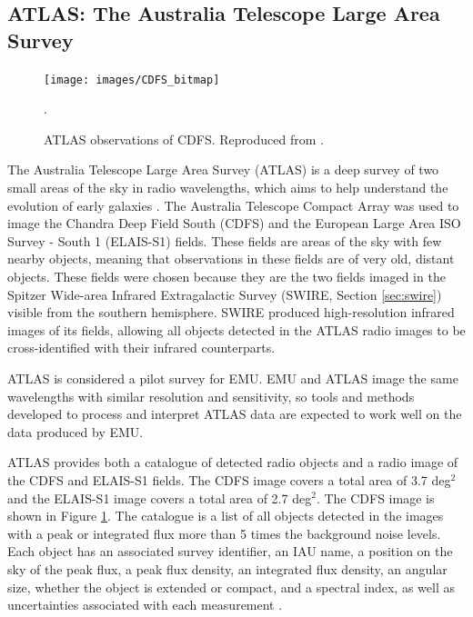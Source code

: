         \subsection{ATLAS: The Australia Telescope Large Area Survey}
        \label{sec:atlas}

            \begin{figure}[!ht]
              \centering
              \texttt{[image: images/CDFS\_bitmap]}
              \caption{ATLAS observations of CDFS. Reproduced from \citet{franzen15}.}.
              \label{fig:cdfs}
            \end{figure}

            The Australia Telescope Large Area Survey (ATLAS) is a deep survey
            of two small areas of the sky in radio wavelengths, which aims to
            help understand the evolution of early galaxies \citep{norris06}.
            The Australia Telescope Compact Array was used to image the Chandra
            Deep Field South (CDFS) and the European Large Area ISO Survey -
            South 1 (ELAIS-S1) fields. These fields are areas of the sky with
            few nearby objects, meaning that observations in these fields are of
            very old, distant objects. These fields were chosen because they are
            the two fields imaged in the Spitzer Wide-area Infrared
            Extragalactic Survey (SWIRE, Section \ref{sec:swire}) visible from
            the southern hemisphere. SWIRE produced high-resolution infrared
            images of its fields, allowing all objects detected in the ATLAS
            radio images to be cross-identified with their infrared
            counterparts.

            ATLAS is considered a pilot survey for EMU. EMU and ATLAS image the
            same wavelengths with similar resolution and sensitivity, so tools
            and methods developed to process and interpret ATLAS data are
            expected to work well on the data produced by EMU.

            ATLAS provides both a catalogue of detected radio objects and a
            radio image of the CDFS and ELAIS-S1 fields. The CDFS image covers a
            total area of 3.7 deg$^2$ and the ELAIS-S1 image covers a total area
            of 2.7 deg$^2$. The CDFS image is shown in Figure \ref{fig:cdfs}.
            The catalogue is a list of all objects detected in the images with a
            peak or integrated flux more than 5 times the background noise
            levels. Each object has an associated survey identifier, an IAU
            name, a position on the sky of the peak flux, a peak flux density,
            an integrated flux density, an angular size, whether the object is
            extended or compact, and a spectral index, as well as uncertainties
            associated with each measurement \citep{franzen15}.

